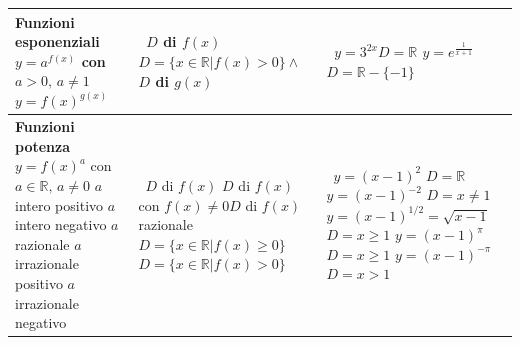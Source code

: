 \begin{table}
\begin{tabularx}{1,2\textwidth}{XXX}
   \textbf{Funzioni esponenziali} \newline $y=a^{f(x)}$ 
\newline con $a>0,\,a\neq1$ \newline\newline  $y={f(x)}^{g(x)}$ 
  & $\,$ \newline $D$ di $f(x)$ \newline \newline \newline 
$D=\{x\in\mathbb{R}\vert f(x)>0\}\land$ $D$ di $g(x)$
  &  $\,$ \newline$y=3^{2x}$\newline $D= \mathbb{R}$ \newline  
\newline$y=e^{\frac{1}{x+1}}$ \newline $D=\mathbb{R}-\{-1\}$ \\
  \midrule
  
  \textbf{Funzioni potenza} \newline $y=f(x)^a$ \newline con 
$a\in\mathbb{R},\,a\neq0$ \newline \newline$a$ intero positivo \newline 
\newline $a$ intero negativo \newline  \newline $a$ razionale \newline  
\newline$a$ irrazionale positivo \newline \newline $a$ irrazionale negativo 
  & $\,$  \newline  \newline  \newline  \newline  $D$ di $f(x)$ 
\newline  \newline $D$ di $f(x)$ con $f(x)\neq0$\newline \newline $D$ di 
$f(x)$ razionale \newline \newline $D=\{x\in\mathbb{R}\vert 
f(x)\geq0\}$\newline \newline $D=\{x\in\mathbb{R}\vert f(x)>0\}$
  & $\,$  \newline  \newline  \newline  \newline $y=(x-1)^2$ 
$D=\mathbb{R}$ \newline \newline $y=(x-1)^{-2}$ $D=x\neq1$ \newline \newline 
$y=(x-1)^{1/2}=\sqrt{x-1}$ $D=x\geq1$ \newline $y=(x-1)^{\pi}$ $D=x\geq1$ 
\newline \newline $y=(x-1)^{-\pi}$ $D=x>1$\\
  \midrule


\end{tabularx}
\end{table}
